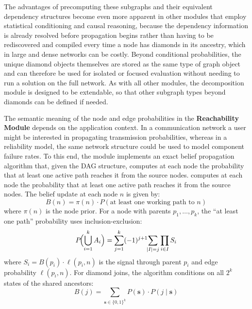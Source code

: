 \documentclass[twocolumn]{rps-esrel2026}
\begin{document}
The advantages of precomputing these subgraphs and their equivalent dependency structures become even more apparent in other modules that employ statistical conditioning and causal reasoning, because the dependency information is already resolved before propagation begins rather than having to be rediscovered and compiled every time a node has diamonds in its ancestry, which in large and dense networks can be costly. Beyond conditional probabilities, the unique diamond objects themselves are stored as the same type of graph object and can therefore be used for isolated or focused evaluation without needing to run a solution on the full network. As with all other modules, the decomposition module is designed to be extendable, so that other subgraph types beyond diamonds can be defined if needed.

The semantic meaning of the node and edge probabilities in the \textbf{Reachability Module} depends on the application context. In a communication network a user might be interested in propagating transmission probabilities, whereas in a reliability model, the same network structure could be used to model component failure rates.  To this end, the module implements an exact belief propagation algorithm that, given the DAG structure, computes at each node the probability that at least one active path reaches it from the source nodes. 
computes at each node the probability that at least one active path reaches it from the source nodes. The belief update at each node $n$ is given by: 
\begin{equation}\label{eq:belief}
B(n) = \pi(n) \cdot P\!\left(\text{at least one working path to } n\right)
\end{equation}
where $\pi(n)$ is the node prior. For a node with parents $p_1, \ldots, p_k$, the ``at least one path'' probability uses inclusion-exclusion:
\begin{equation}\label{eq:inclexcl}
P\!\Bigl(\bigcup_{i=1}^{k} A_i\Bigr) = \sum_{j=1}^{k} (-1)^{j+1} \!\!\sum_{|I|=j} \prod_{i \in I} S_i
\end{equation}
where $S_i = B(p_i) \cdot \ell(p_i, n)$ is the signal through parent $p_i$ and edge probability $\ell(p_i, n)$. For diamond joins, the algorithm conditions on all $2^k$ states of the shared ancestors:
\begin{equation}\label{eq:diamond_cond}
B(j) = \sum_{\mathbf{s} \in \{0,1\}^k} P(\mathbf{s}) \cdot P(j \mid \mathbf{s})
\end{equation}
\end{document}
